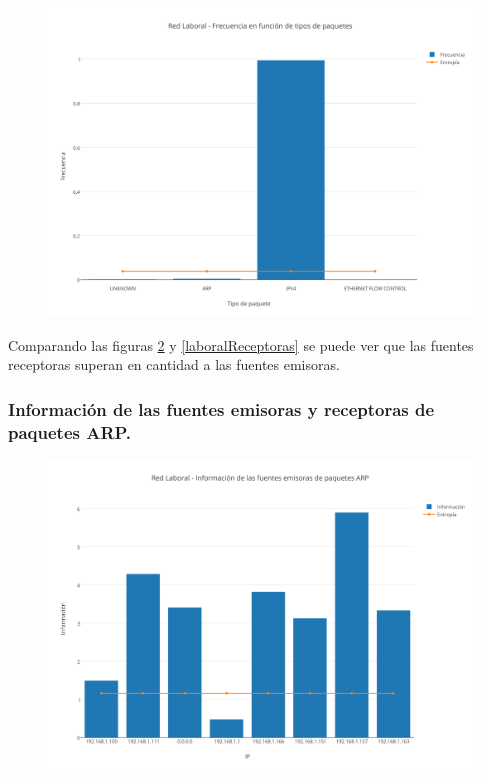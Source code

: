 \begin{figure}[h!]
    \centering                                                       
    \includegraphics[width=400pt]{img/LaboralFrecuenciaVsTipoPaquetes}
    \caption{}
    \label{laboralPaquetes}
\end{figure}

Comparando las figuras \ref{laboralEmisoras} y \ref{laboralReceptoras} se puede ver que las fuentes receptoras superan en cantidad a las fuentes emisoras.\\

\subsubsection{Informaci\'on de las fuentes emisoras y receptoras de paquetes ARP.}

\begin{figure}[h!]
    \centering                                                       
    \includegraphics[width=400pt]{img/RedLaboralFuentesEmisorasARP}
    \caption{}
    \label{laboralEmisoras}
\end{figure}

